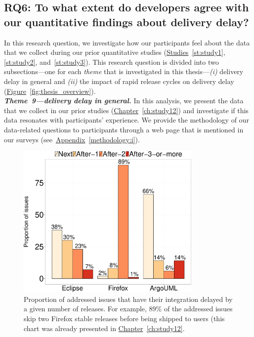\subsection*{\textbf{RQ6: To what extent do developers agree with our
		quantitative findings about delivery delay?}}

In this research question, we investigate how our participants feel about the
data that we collect during our prior quantitative studies
(\hyperref[st:study1]{Studies}~\ref{st:study1}, \ref{st:study2},
and~\ref{st:study3}). This research question
is divided into two subsections---one for each {\em theme} that is investigated
in this thesis---{\em (i)} delivery delay in general
and {\em (ii)} the impact of rapid release cycles on delivery delay
(\hyperref[fig:thesis_overview]{Figure}~\ref{fig:thesis_overview}).\\


\noindent\textit{\textbf{Theme~9---delivery delay in general.}}
In this analysis, we present the data that we collect in our prior studies
(\hyperref[ch:study12]{Chapter}~\ref{ch:study12}) and investigate if this data
resonates with participants' experience. We provide the methodology of our
data-related questions to participants through a web page that is mentioned in
our surveys (see~\hyperref[methodology:i]{Appendix}~\ref{methodology:i}).

\begin{figure}
	\centering
	\includegraphics[width=0.80\textwidth,keepaspectratio]
	{chapters/chapter5/figures/rq6/datasets.pdf}
	\caption{Proportion of addressed issues that have their integration
		delayed by a given number of releases. For example, 89\% of the
	addressed issues skip two Firefox stable releases before being shipped
to users (this chart was already presented in
\hyperref[ch:study12]{Chapter}~\ref{ch:study12}. }
	\label{fig:data-related-rq1}
\end{figure}

